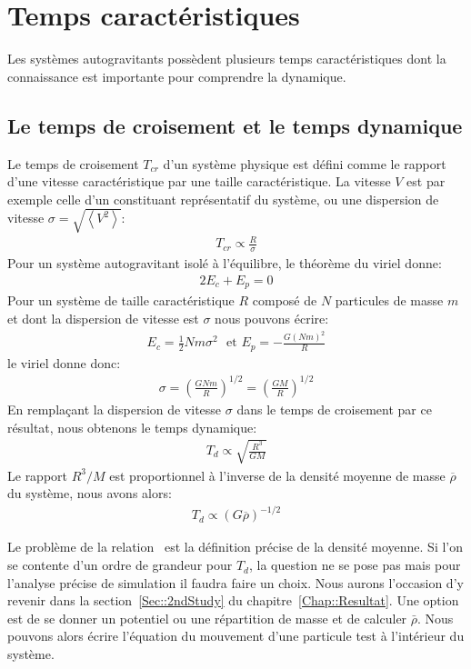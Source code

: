 \section{Temps caractéristiques\label{chap_trelax}}

Les systèmes autogravitants possèdent plusieurs temps caractéristiques dont la connaissance est importante pour comprendre la dynamique.

\subsection{Le temps de croisement et le temps dynamique}

Le temps de croisement $T_{cr}$ d'un système physique est défini comme le rapport d'une vitesse caractéristique par une taille caractéristique. La
vitesse $V$ est par exemple celle d'un constituant représentatif du système, ou une dispersion de vitesse $\sigma=\sqrt{\left\langle
V^{2}\right\rangle}$:
\begin{align*}
	T_{cr}\propto\frac{R}{\sigma}%
\end{align*}
Pour un système autogravitant isolé à l'équilibre, le théorème du viriel donne:
\begin{align*}
	2E_{c}+E_{p}=0
\end{align*}
Pour un système de taille caractéristique $R$ composé de $N$ particules de masse $m$ et dont la dispersion de vitesse est $\sigma$ nous pouvons écrire:
\begin{align*}
	E_{c}=\frac{1}{2}Nm\sigma^{2}\ \ \ \text{et\ \ \ }E_{p}=-\frac{G\left(Nm\right)^{2}}{R}%
\end{align*}
le viriel donne donc:
\begin{align*}
	\sigma=\left(  \frac{GNm}{R}\right)  ^{1/2}=\left(  \frac{GM}{R}\right) ^{1/2}%
\end{align*}
En remplaçant la dispersion de vitesse $\sigma$ dans le temps de croisement par ce résultat, nous obtenons le temps dynamique:
\begin{align*}
	T_{d}\propto\sqrt{\frac{R^{3}}{GM}}%
\end{align*}
Le rapport $R^{3}/M$ est proportionnel à l'inverse de la densité moyenne de masse $\overline{\rho}$ du système, nous avons alors:
\begin{align}
	T_{d}\propto\left(  G\overline{\rho}\right)  ^{-1/2} \label{def:T-dyn_tcr} %
\end{align}

Le problème de la relation~ est la définition précise de la densité moyenne. Si l'on se contente d'un ordre de grandeur pour $T_d$,
la question ne se pose pas mais pour l'analyse précise de simulation il faudra faire un choix. Nous aurons l'occasion d'y revenir dans la
section~\ref{Sec::2ndStudy} du chapitre~\ref{Chap::Resultat}.
Une option est de se donner un potentiel ou une répartition de masse et de calculer $\bar{\rho}$. %
Nous pouvons alors écrire l'équation du mouvement d'une particule test à l'intérieur du système.

